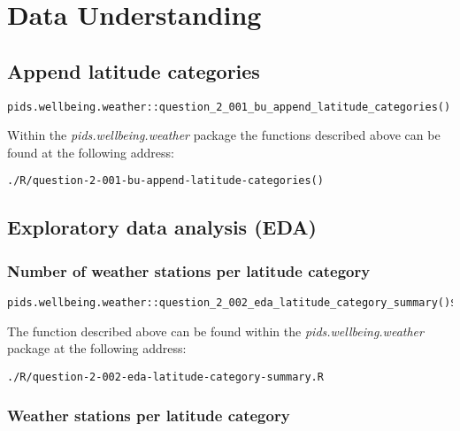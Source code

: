 \documentclass[12pt, oneside, openany]{book}
\begin{document}
\section*{Data Understanding}

\subsection*{Append latitude categories}

\begin{verbatim}
pids.wellbeing.weather::question_2_001_bu_append_latitude_categories()
\end{verbatim}

Within the \emph{pids.wellbeing.weather} package the functions described above can be found at the following address:

\begin{verbatim}
./R/question-2-001-bu-append-latitude-categories()
\end{verbatim}

\subsection*{Exploratory data analysis (EDA)}

\subsubsection*{Number of weather stations per latitude category}

\begin{verbatim}
pids.wellbeing.weather::question_2_002_eda_latitude_category_summary()$nrow
\end{verbatim}

The function described above can be found within the \emph{pids.wellbeing.weather} package at the following address:

\begin{verbatim}
./R/question-2-002-eda-latitude-category-summary.R
\end{verbatim}

\subsubsection*{Weather stations per latitude category}
\end{document}
